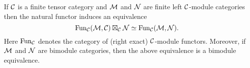 \documentclass{amsart}
\begin{document}



\CSPcomm{


}





\begin{lemma}
	If $\mathcal C$ is a finite tensor category and $\mathcal M$ and $\mathcal N$ are finite left $\mathcal C$-module categories then the natural functor induces an equivalence
	\begin{equation*}
		\operatorname{Fun}_\mathcal C(\mathcal M, \mathcal C) \boxtimes_\mathcal C \mathcal N \simeq \operatorname{Fun}_\mathcal C(\mathcal M,\mathcal N).
	\end{equation*}
	Here $\operatorname{Fun}_\mathcal C$ denotes the category of (right exact) $\mathcal C$-module functors. 
	Moreover, if $\mathcal M$ and $\mathcal N$ are bimodule categories, then the above equivalence is a bimodule equivalence. 
\end{lemma}
\end{document}
